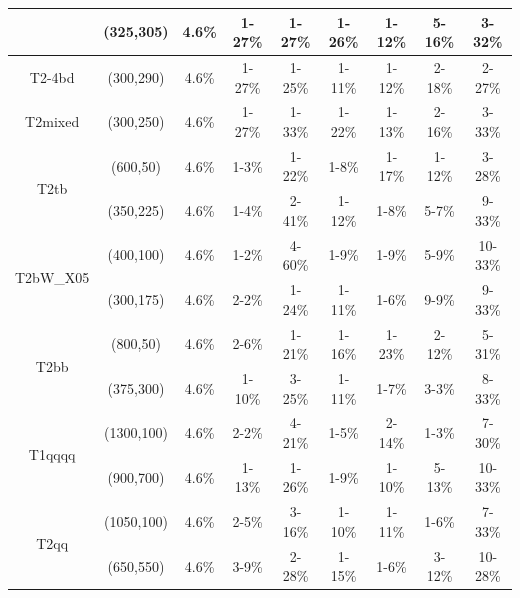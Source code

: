 \begin{table}[h!]
\begin{tabular}{ ccccccccc }
 & (325,305) & 4.6\% & 1-27\% & 1-27\% & 1-26\% & 1-12\% & 5-16\% & 3-32\% \\ \hline 
\multirow{1}{*}{T2-4bd}
 & (300,290) & 4.6\% & 1-27\% & 1-25\% & 1-11\% & 1-12\% & 2-18\% & 2-27\% \\ \hline 
\multirow{1}{*}{T2mixed}
 & (300,250) & 4.6\% & 1-27\% & 1-33\% & 1-22\% & 1-13\% & 2-16\% & 3-33\% \\ \hline 
\multirow{2}{*}{T2tb}
 & (600,50) & 4.6\% & 1-3\% & 1-22\% & 1-8\% & 1-17\% & 1-12\% & 3-28\% \\ 
 & (350,225) & 4.6\% & 1-4\% & 2-41\% & 1-12\% & 1-8\% & 5-7\% & 9-33\% \\ \hline 
\multirow{2}{*}{T2bW\_X05}
 & (400,100) & 4.6\% & 1-2\% & 4-60\% & 1-9\% & 1-9\% & 5-9\% & 10-33\% \\ 
 & (300,175) & 4.6\% & 2-2\% & 1-24\% & 1-11\% & 1-6\% & 9-9\% & 9-33\% \\ \hline 
\multirow{2}{*}{T2bb}
 & (800,50) & 4.6\% & 2-6\% & 1-21\% & 1-16\% & 1-23\% & 2-12\% & 5-31\% \\ 
 & (375,300) & 4.6\% & 1-10\% & 3-25\% & 1-11\% & 1-7\% & 3-3\% & 8-33\% \\ \hline 
\multirow{2}{*}{T1qqqq}
 & (1300,100) & 4.6\% & 2-2\% & 4-21\% & 1-5\% & 2-14\% & 1-3\% & 7-30\% \\ 
 & (900,700) & 4.6\% & 1-13\% & 1-26\% & 1-9\% & 1-10\% & 5-13\% & 10-33\% \\ \hline 
\multirow{2}{*}{T2qq}
 & (1050,100) & 4.6\% & 2-5\% & 3-16\% & 1-10\% & 1-11\% & 1-6\% & 7-33\% \\ 
 & (650,550) & 4.6\% & 3-9\% & 2-28\% & 1-15\% & 1-6\% & 3-12\% & 10-28\% \\ \hline 
    \hline
  \end{tabular}
\end{table}


